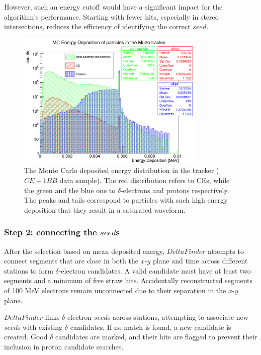However, such an energy cutoff would have a 
significant impact for the algorithm's performance. 
Starting with fewer hits, especially in 
stereo intersections, reduces the efficiency of identifying the correct $seed$. 

\begin{figure}[!h]
    \centering
    \includegraphics[width =0.8\textwidth]{figures/png/Screenshot_20240729_151910.png}
\caption[Monte Carlo deposited energy 
distribution in the tracker.]{
   The Monte Carlo deposited energy 
   distribution in the tracker ($CE-1BB$ data sample).  
   The red distribution refers to 
   CEs, while the 
   green and the blue one to $\delta$-electrons 
   and protons respectively. 
   The peaks and tails correspond to 
   particles with such high energy 
   deposition that they result in a 
   saturated waveform.
}
   \label{fig:energydeposited}
\end{figure}
\subsubsection{Step 2: connecting the $seed$s}
After the selection based on mean deposited energy, 
$DeltaFinder$ attempts to connect segments that 
are close in both the $x$-$y$ plane and time 
across different stations to form $\delta$-electron 
candidates. A valid candidate must have at 
least two segments and a minimum of five straw hits. 
Accidentally reconstructed segments of 100 MeV electrons  
remain unconnected due 
to their separation in the $x$-$y$ plane. 

$DeltaFinder$ links $\delta$-electron $seed$s 
across stations, attempting to associate new $seed$s 
with existing $\delta$ candidates. If no match is 
found, a new candidate is created. Good $\delta$ 
candidates are marked, and their hits are 
flagged to prevent their inclusion in proton candidate searches.

